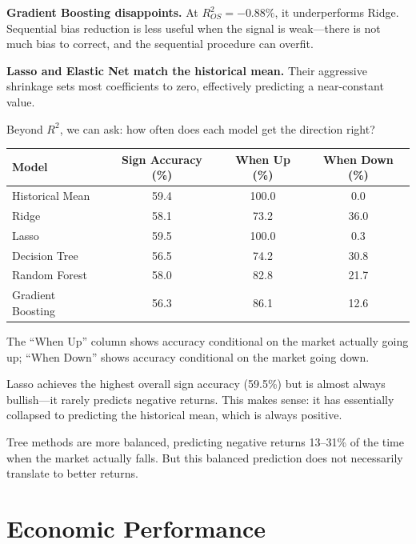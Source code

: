 \documentclass[11pt,a4paper]{article}
\begin{document}
\textbf{Gradient Boosting disappoints.} At $R^2_{OS} = -0.88\%$, it underperforms Ridge. Sequential bias reduction is less useful when the signal is weak---there is not much bias to correct, and the sequential procedure can overfit.

\textbf{Lasso and Elastic Net match the historical mean.} Their aggressive shrinkage sets most coefficients to zero, effectively predicting a near-constant value.

Beyond $R^2$, we can ask: how often does each model get the direction right?

\begin{center}
\begin{tabular}{lccc}
\toprule
\textbf{Model} & \textbf{Sign Accuracy (\%)} & \textbf{When Up (\%)} & \textbf{When Down (\%)} \\
\midrule
Historical Mean & 59.4 & 100.0 & 0.0 \\
\midrule
Ridge & 58.1 & 73.2 & 36.0 \\
Lasso & 59.5 & 100.0 & 0.3 \\
\midrule
Decision Tree & 56.5 & 74.2 & 30.8 \\
Random Forest & 58.0 & 82.8 & 21.7 \\
Gradient Boosting & 56.3 & 86.1 & 12.6 \\
\bottomrule
\end{tabular}
\end{center}

The ``When Up'' column shows accuracy conditional on the market actually going up; ``When Down'' shows accuracy conditional on the market going down.

Lasso achieves the highest overall sign accuracy (59.5\%) but is almost always bullish---it rarely predicts negative returns. This makes sense: it has essentially collapsed to predicting the historical mean, which is always positive.

Tree methods are more balanced, predicting negative returns 13--31\% of the time when the market actually falls. But this balanced prediction does not necessarily translate to better returns.

\section{Economic Performance}
\end{document}
